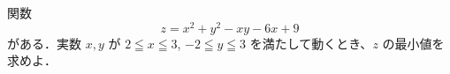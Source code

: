 \documentclass[8pt,dvipdfmx]{article}
\begin{document}
\begin{tcolorbox}[title=数学\textcircled{1} 1- 7 C]
関数
\[
z = x^2 + y^2 - xy - 6x + 9
\]
がある．実数 \(x, y\) が \(2 \leqq x \leqq 3\), \(-2 \leqq y \leqq 3\) を満たして動くとき、\(z\) の最小値を求めよ．
\end{tcolorbox}

\end{document}
